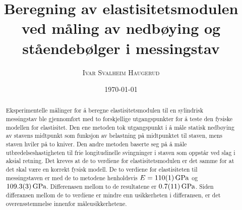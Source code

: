 \documentclass[%
 reprint,
 amsmath,amssymb,
 aps,
 norsk,
 booktabs
]{revtex4-1}
\begin{document}
\title{Beregning av elastisitetsmodulen ved måling av nedbøying og ståendebølger i messingstav}
\author{\textsc{Ivar Svalheim Haugerud}}
\date{\today}

\begin{abstract}
  Eksperimentelle målinger for å beregne elastisitetsmodulen til en sylindrisk messingstav ble gjennomført med to forskjellige utgangspunkter for å teste den fysiske modellen for elastisitet. Den ene metoden tok utgangspunkt i å måle statisk nedbøying av stavens midtpunkt som funksjon av belastning på midtpunktet til staven, mens staven hviler på to kniver. Den andre metoden baserte seg på å måle utbredelseshastigheten til frie longitudinelle svingninger i staven som oppstår ved slag i aksial retning. Det kreves at de to verdiene for elastisitetsmodulen er det samme for at det skal være en korrekt fysisk modell. De to verdiene for elastisiteten til messingstaven er med de to metodene henholdsvis
  $E=\SI{110\pm1}{\giga\pascal}$ og $\SI{109.3\pm0.3}{\giga\pascal}$. Differenasen mellom to de resultatene er $\SI{0.7\pm1.1}{\giga\pascal}$. Siden differansen mellom de to verdiene er mindre enn usikkerheten i differansen, er det overensstemmelse innenfor måleusikkerhetene.
\end{abstract}

\maketitle

\end{document}
